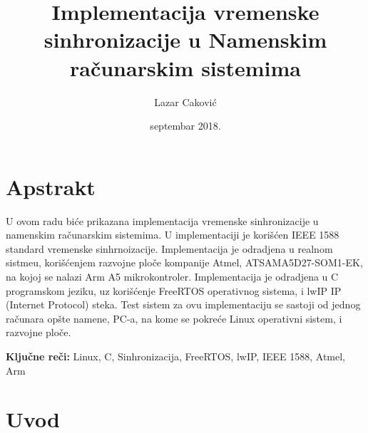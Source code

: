 \documentclass[a4paper,12pt, master]{etf}
\title{Implementacija vremenske sinhronizacije u Namenskim ra\v{c}unarskim sistemima}
\author{Lazar Caković}
\date{septembar 2018.}
\begin{document}
	\maketitle

	\tableofcontents

	\listoffigures

	\newpage

	\chapter{Apstrakt}

	U ovom radu bi\'{c}e prikazana implementacija vremenske sinhronizacije u 
	namenskim ra\v{c}unarskim sistemima. U implementaciji je kori\v{s}\'{c}en 
	IEEE 1588 standard vremenske sinhrnoizacije. Implementacija je odradjena u 
	realnom sistmeu, kori\v{s}\'{c}enjem razvojne plo\v{c}e kompanije Atmel, 
	ATSAMA5D27-SOM1-EK, na kojoj se nalazi Arm A5 mikrokontroler. 
	Implementacija je odradjena u C programskom jeziku, uz kori\v{s}\'{c}enje 
	FreeRTOS operativnog sistema, i lwIP IP (Internet Protocol) steka. Test 
	sistem za ovu implementaciju se sastoji od jednog ra\v{c}unara op\v{s}te 
	namene, PC-a, na kome se pokre\'{c}e Linux operativni sistem, i razvojne 
	plo\v{c}e.

	\vspace{2cm}

	\textbf{Klju\v{c}ne re\v{c}i:}
	Linux, C, Sinhronizacija, FreeRTOS, lwIP, IEEE 1588, Atmel, Arm

	\newpage

	\chapter{Uvod}
\end{document}
